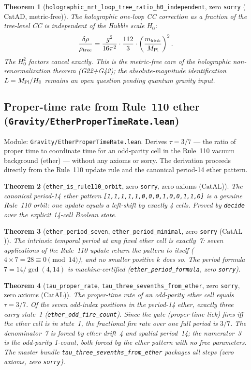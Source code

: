 \documentclass[11pt,a4paper]{article}
\newtheorem{theorem}{Theorem}[section]
\theoremstyle{definition}
\newcommand{\CatAL}{\ensuremath{\mathrm{CatAL}}}
\newcommand{\CatAD}{\ensuremath{\mathrm{CatAD}}}
\begin{document}
\begin{theorem}[\lstinline|holographic_nrt_loop_tree_ratio_h0_independent|, zero \texttt{sorry} ($\CatAD$, metric-free)]
The holographic one-loop CC correction as a fraction of the tree-level CC is
independent of the Hubble scale $H_0$:
\[ \frac{\delta\rho}{\rho_{\rm tree}}
   = \frac{g^2}{16\pi^2}\cdot\frac{112}{3}\cdot\left(\frac{m_{\rm kink}}{M_{\rm Pl}}\right)^2. \]
The $H_0^2$ factors cancel exactly.  This is the metric-free core of the
holographic non-renormalization theorem (G22+G42); the absolute-magnitude
identification $L = M_{\rm Pl}/H_0$ remains an open question pending quantum gravity input.
\end{theorem}

\subsection{Proper-time rate from Rule~110 ether (\texttt{Gravity/EtherProperTimeRate.lean})}\label{subsec:ether-proper-time-rate}

Module: \texttt{Gravity/EtherProperTimeRate.lean}.  Derives $\tau = 3/7$ — the
ratio of proper time to coordinate time for an odd-parity cell in the Rule~110
vacuum background (ether) — without any axioms or sorry.  The derivation proceeds
directly from the Rule~110 update rule and the canonical period-14 ether pattern.

\begin{theorem}[\lstinline|ether_is_rule110_orbit|, zero \texttt{sorry}, zero axioms ($\CatAL$)]
The canonical period-14 ether pattern \texttt{[1,1,1,1,1,0,0,0,1,0,0,1,1,0]} is a
genuine Rule~110 orbit: one update equals a left-shift by exactly 4 cells.
Proved by \texttt{decide} over the explicit 14-cell Boolean state.
\end{theorem}

\begin{theorem}[\lstinline|ether_period_seven|, \lstinline|ether_period_minimal|, zero \texttt{sorry} ($\CatAL$)]
The intrinsic temporal period at any fixed ether cell is exactly~7: seven applications
of the Rule~110 update return the pattern to itself ($4 \times 7 = 28 \equiv 0 \pmod{14}$),
and no smaller positive $k$ does so.  The period formula $7 = 14/\gcd(4,14)$ is
machine-certified (\lstinline|ether_period_formula|, zero \texttt{sorry}).
\end{theorem}

\begin{theorem}[\lstinline|tau_proper_rate|, \lstinline|tau_three_sevenths_from_ether|, zero \texttt{sorry}, zero axioms ($\CatAL$)]
\label{thm:tau-three-sevenths}
The proper-time rate of an odd-parity ether cell equals $\tau = 3/7$.
Of the seven odd-index positions in the period-14 ether, exactly three carry state~1
(\lstinline|ether_odd_fire_count|).  Since the gate (proper-time tick) fires iff the
ether cell is in state~1, the fractional fire rate over one full period is $3/7$.
The denominator~7 is forced by ether drift~4 and spatial period~14; the numerator~3 is
the odd-parity 1-count, both forced by the ether pattern with no free parameters.
The master bundle \lstinline|tau_three_sevenths_from_ether| packages all steps (zero
axioms, zero \texttt{sorry}).
\end{theorem}
\end{document}
